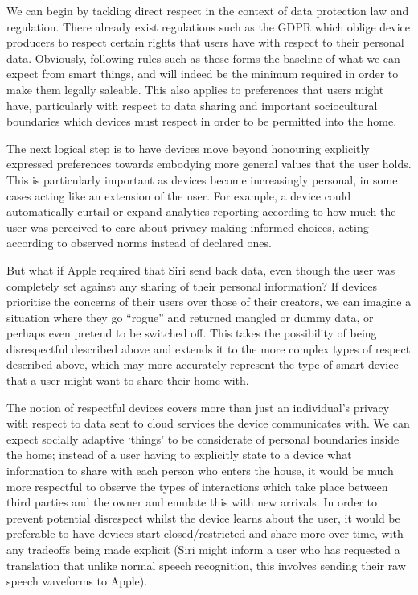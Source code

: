 \documentclass{IETpaper}
\begin{document}
We can begin by tackling direct respect in the context of data protection law and regulation. There already exist regulations such as the GDPR which oblige device producers to respect certain rights that users have with respect to their personal data. Obviously, following rules such as these forms the baseline of what we can expect from smart things, and will indeed be the minimum required in order to make them legally saleable. This also applies to preferences that users might have, particularly with respect to data sharing and important sociocultural boundaries which devices must respect in order to be permitted into the home.

The next logical step is to have devices move beyond honouring explicitly expressed preferences towards embodying more general values that the user holds. This is particularly important as devices become increasingly personal, in some cases acting like an extension of the user. For example, a device could automatically curtail or expand analytics reporting according to how much the user was perceived to care about privacy making informed choices, acting according to observed norms instead of declared ones. 

But what if Apple required that Siri send back data, even though the user was completely set against any sharing of their personal information? If devices prioritise the concerns of their users over those of their creators, we can imagine a situation where they go “rogue” and returned mangled or dummy data, or perhaps even pretend to be switched off. This takes the possibility of being disrespectful described above and extends it to the more complex types of respect described above, which may more accurately represent the type of smart device that a user might want to share their home with.

The notion of respectful devices covers more than just an individual's privacy with respect to data sent to cloud services the device communicates with. We can expect socially adaptive ‘things’ to be considerate of personal boundaries inside the home; instead of a user having to explicitly state to a device what information to share with each person who enters the house, it would be much more respectful to observe the types of interactions which take place between third parties and the owner and emulate this with new arrivals. In order to prevent potential disrespect whilst the device learns about the user, it would be preferable to have devices start closed/restricted and share more over time, with any tradeoffs being made explicit (Siri might inform a user who has requested a translation that unlike normal speech recognition, this involves sending their raw speech waveforms to Apple).
\end{document}
